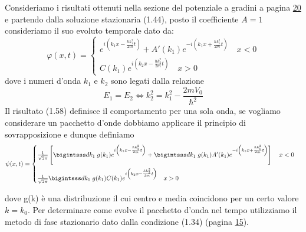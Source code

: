 Consideriamo i risultati ottenuti nella sezione del potenziale a gradini a pagina \hyperlink{page.20}{20} e partendo dalla soluzione stazionaria (1.44), posto il coefficiente $A = 1$ consideriamo il suo evoluto temporale dato da:
\begin{equation}
\varphi(x,t) = 
\begin{cases}
	e^{i \left (k_1x - \frac{\hbar k_{1}^2}{2m}t \right)} + A'(k_1)e^{-i \left (k_1x + \frac{\hbar k_{1}^2}{2m}t \right)} \quad x<0 \\[0.5cm]
	C(k_1)e^{i \left (k_2x - \frac{\hbar k_{2}^2}{2m}t \right)} \quad x > 0
\end{cases}
\end{equation}
dove i numeri d'onda $k_1$ e $k_2$ sono legati dalla relazione
\begin{equation*}
	E_1 = E_2 \iff k_2^2 = k_1^2 - \frac{2mV_0}{\hbar^2}
\end{equation*}
Il risultato (1.58) definisce il comportamento per una sola onda, se vogliamo considerare un pacchetto d'onde dobbiamo applicare il principio di sovrapposizione e dunque definiamo 
\begin{equation}
	\psi(x,t) = \begin{cases}
		 \frac{1}{\sqrt{2 \pi}} \left [  \bigintsss dk_1 \; g(k_1)e^{i \left (k_1x - \frac{\hbar k_{1}^2}{2m}t \right)} + \bigintsss dk_1 \; g(k_1)A'(k_1)e^{-i \left (k_1x + \frac{\hbar k_{1}^2}{2m}t \right)}\right ] \quad x<0 \\[0.5cm]
	\frac{1}{\sqrt{2\pi}} \bigintsss dk_1 \;g(k_1)C(k_1)e^{i \left (k_2x - \frac{\hbar k_{2}^2}{2m}t \right)} \quad x > 0
	\end{cases}
\end{equation}

dove g(k) \`e una distribuzione il cui centro e media coincidono per un certo valore $k = k_0$. Per determinare come evolve il pacchetto d'onda nel tempo utilizziamo il metodo di fase stazionario dato dalla condizione (1.34) (pagina \hyperlink{page.15}{15}).  
\newline

